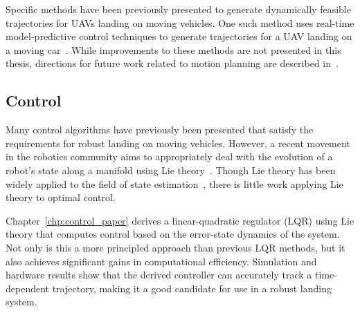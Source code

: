 Specific methods have been previously
presented to generate dynamically feasible trajectories for UAVs landing on moving
vehicles. One such method uses real-time model-predictive control techniques to
generate trajectories for a UAV landing on a moving car~\cite{baca2019autonomous}.
While improvements to these methods are not presented in this thesis, 
directions for future work related to motion planning are described
in~.

\subsection{Control}
Many control algorithms have previously been presented that satisfy the
requirements for robust landing on moving vehicles.
However, a recent
movement in the robotics community aims to appropriately deal with the evolution of a
robot's state along a manifold using Lie theory~\cite{sola2018micro}. Though
Lie theory has been widely applied to the field of state
estimation~\cite{sola2017quaternion, koch2017relative}, there is little 
work applying Lie theory to optimal control.

Chapter~\ref{chp:control_paper} derives a
linear-quadratic regulator (LQR) using Lie theory that computes control based on
the error-state dynamics of the system. Not only is this a more principled
approach than previous LQR methods, but it also achieves significant gains in computational efficiency.
Simulation and hardware results show that the derived controller can accurately
track a time-dependent trajectory, making it a good candidate for use in a
robust landing system.

